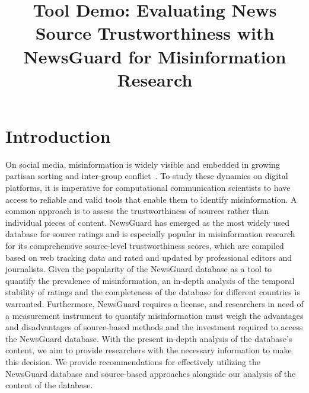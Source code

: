 \documentclass{article}
\title{Tool Demo: Evaluating News Source Trustworthiness with NewsGuard for Misinformation Research}
\begin{document}
\maketitle

\section{Introduction}
On social media, misinformation is widely visible \citep{lazerScienceFakeNews2018} and embedded in growing partisan sorting and inter-group conflict~\citep{gonzalez-bailonAsymmetricIdeologicalSegregation2023a}. 
To study these dynamics on digital platforms, it is imperative for computational communication scientists to have access to reliable and valid tools that enable them to identify misinformation. 
A common approach is to assess the trustworthiness of sources rather than individual pieces of content. 
NewsGuard has emerged as the most widely used database for source ratings \citep{celadinDisplayingNewsSource2023, guessExposureUntrustworthyWebsites2020a, lasserSocialMediaSharing2022c, pratelliSwingingStatesDoes2023, robertsonUsersChooseEngage2023a} and is especially popular in misinformation research for its comprehensive source-level trustworthiness scores, which are compiled based on web tracking data and rated and updated by professional editors and journalists.
Given the popularity of the NewsGuard database as a tool to quantify the prevalence of misinformation, an in-depth analysis of the temporal stability of ratings and the completeness of the database for different countries is warranted.
Furthermore, NewsGuard requires a license, and researchers in need of a measurement instrument to quantify misinformation must weigh the advantages and disadvantages of source-based methods and the investment required to access the NewsGuard database. 
With the present in-depth analysis of the database's content, we aim to provide researchers with the necessary information to make this decision.
We provide recommendations for effectively utilizing the NewsGuard database and source-based approaches alongside our analysis of the content of the database.
\end{document}
